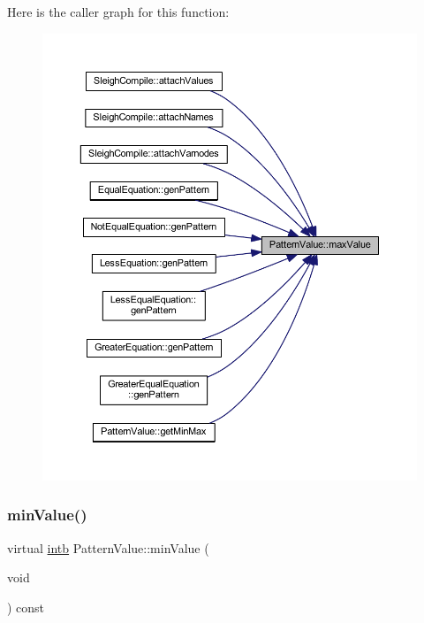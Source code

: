 Here is the caller graph for this function\+:
\nopagebreak
\begin{figure}[H]
\begin{center}
\leavevmode
\includegraphics[width=350pt]{class_pattern_value_a865e8f34e031ef31f77dcaa93d76820d_icgraph}
\end{center}
\end{figure}
\mbox{\label{class_pattern_value_a0dbf85240fe6310e36596fea3bb02f2e}} 
\subsubsection{\texorpdfstring{minValue()}{minValue()}}
{\footnotesize\ttfamily virtual \mbox{\hyperlink{types_8h_aa925ba3e627c2df89d5b1cfe84fb8572}{intb}} Pattern\+Value\+::min\+Value (\begin{DoxyParamCaption}\item[{void}]{ }\end{DoxyParamCaption}) const\hspace{0.3cm}{\ttfamily [pure virtual]}}



